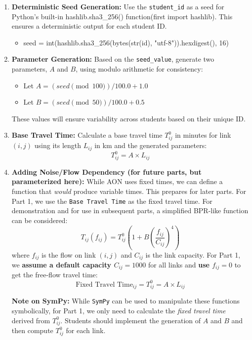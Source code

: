 \documentclass{rapportCS} %
\begin{document}
\begin{enumerate}
    \item \textbf{Deterministic Seed Generation:} Use the \texttt{student\_id} as a seed for Python's built-in hashlib.sha3\_256() function(first import hashlib). This ensures a deterministic output for each student ID.
    \begin{itemize}
        \item seed = int(hashlib.sha3\_256(bytes(str(id), "utf-8")).hexdigest(), 16)
    \end{itemize}

    \item \textbf{Parameter Generation:} Based on the \texttt{seed\_value}, generate two parameters, \( A \) and \( B \), using modulo arithmetic for consistency:
    \begin{itemize}
        \item Let \( A = (seed \pmod{100}) / 100.0 + 1.0 \)
        \item Let \( B = (seed \pmod{50}) / 100.0 + 0.5 \)
    \end{itemize}
    These values will ensure variability across students based on their unique ID.


    \item \textbf{Base Travel Time:} Calculate a base travel time \( T_{ij}^0 \) in minutes for link \( (i, j) \) using its length \( L_{ij} \) in km and the generated parameters:
    $$ T_{ij}^0 = A \times L_{ij} $$

    \item \textbf{Adding Noise/Flow Dependency (for future parts, but parameterized here):}
    While AON uses fixed times, we can define a function that \textit{would} produce variable times. This prepares for later parts. For Part 1, we use the \texttt{Base Travel Time} as the fixed travel time.
    For demonstration and for use in subsequent parts, a simplified BPR-like function can be considered:
    $$ T_{ij}(f_{ij}) = T_{ij}^0 \left( 1 + B \left( \frac{f_{ij}}{C_{ij}} \right)^4 \right) $$
    where \( f_{ij} \) is the flow on link \( (i, j) \) and \( C_{ij} \) is the link capacity. For Part 1, we \textbf{assume a default capacity $C_{ij} = 1000$} for all links and \textbf{use $f_{ij}=0$} to get the free-flow travel time:
    $$ \text{Fixed Travel Time}_{ij} = T_{ij}^0 = A \times L_{ij} $$

    \textbf{Note on SymPy:} While \texttt{SymPy} can be used to manipulate these functions symbolically, for Part 1, we only need to calculate the \textit{fixed travel time} derived from \( T_{ij}^0 \). Students should implement the generation of \( A \) and \( B \) and then compute \( T_{ij}^0 \) for each link.
\end{enumerate}
\end{document}
